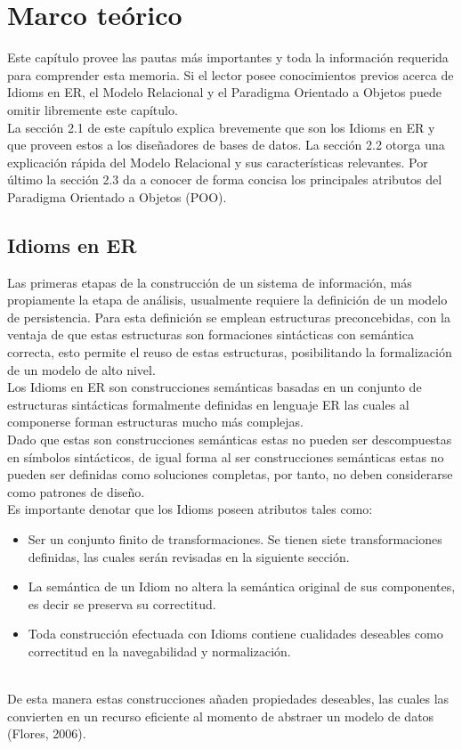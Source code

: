 
\chapter{Marco teórico}
\noindent Este capítulo provee las pautas más importantes y toda la información requerida para
\noindent comprender esta memoria. Si el lector posee conocimientos previos acerca de Idioms en ER,
\noindent el Modelo Relacional y el Paradigma Orientado a Objetos puede omitir libremente este
\noindent capítulo. \\
\indent  La sección 2.1 de este capítulo explica brevemente que son los Idioms en ER y que
\noident proveen estos a los diseñadores de bases de datos. La sección 2.2 otorga una explicación
\noident rápida del Modelo Relacional y sus características relevantes. Por último la sección 2.3
\noident da a conocer de forma concisa los principales atributos del Paradigma Orientado a Objetos (POO).
\section {Idioms en ER}
\noident Las primeras etapas de la construcción de un sistema de información, más propiamente
\noident la etapa de análisis, usualmente requiere la definición de un modelo de persistencia.
\noident Para esta definición se emplean estructuras preconcebidas, con la ventaja de que estas estructuras
\noident son formaciones sintácticas con semántica correcta, esto permite el reuso de estas estructuras, posibilitando
\noident la formalización de un modelo de alto nivel. \\
\indent  Los Idioms en ER son construcciones semánticas basadas en un conjunto de estructuras sintácticas formalmente
\noident definidas en lenguaje ER las cuales al componerse forman estructuras mucho más complejas.\\
\noident Dado que estas son construcciones semánticas estas no pueden ser descompuestas en símbolos sintácticos,
\noident de igual forma al ser construcciones semánticas estas no pueden ser definidas como soluciones completas,
\noident por tanto, no deben considerarse como patrones de diseño.\\
\noident Es importante denotar que los Idioms poseen atributos tales como:

\begin{itemize}
    \item Ser un conjunto finito de transformaciones. Se tienen siete transformaciones definidas, las cuales serán revisadas en la siguiente sección.
    \item La semántica de un Idiom no altera la semántica original de sus componentes, es decir se preserva su correctitud.
    \item Toda construcción efectuada con Idioms contiene cualidades deseables como correctitud en la navegabilidad y normalización.
\end{itemize} \\
\noident De esta manera estas construcciones añaden propiedades deseables, las cuales las convierten en un recurso eficiente al
\noident momento de abstraer un modelo de datos (Flores, 2006).
